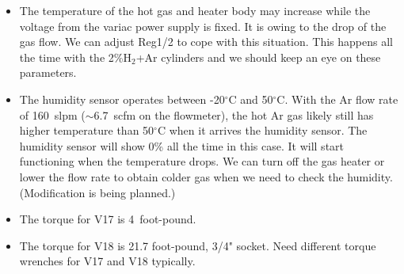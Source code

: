 \documentclass[letterpaper,11pt]{article}
\newcommand{\Hydro}     {H$_2$}
\newcommand{\dC}        {$^\circ$C}
\begin{document}
\begin{itemize}
\item The temperature of the hot gas and heater body may increase while the voltage from the variac power supply
is fixed.  It is owing to the drop of the gas flow.  We can adjust Reg1/2 to cope with this situation.
This happens all the time with the 2\%{\Hydro}+Ar cylinders and we should keep an eye on these parameters.
\item The humidity sensor operates between -20{\dC} and 50{\dC}.
With the Ar flow rate of 160~slpm ($\sim$6.7~scfm on the flowmeter), the hot Ar gas likely still has higher
temperature than 50{\dC} when it arrives the humidity sensor.
The humidity sensor will show 0\% all the time in this case.
It will start functioning when the temperature drops.
We can turn off the gas heater or lower the flow rate to obtain colder gas when we need to
check the humidity.
(Modification is being planned.)
\item The torque for V17 is 4~foot-pound.
\item The torque for V18 is 21.7 foot-pound, 3/4" socket.  Need different torque wrenches for V17 and V18 typically.
\end{itemize}
\end{document}
